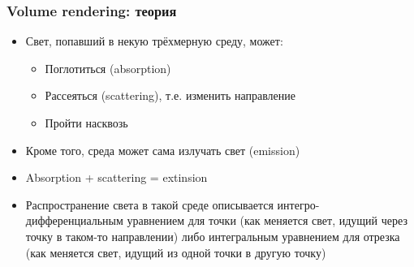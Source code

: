 \documentclass{beamer}
\begin{document}
\begin{frame}[fragile]
\frametitle{Volume rendering: теория}
\begin{itemize}
\item Свет, попавший в некую трёхмерную среду, может:
\pause
\begin{itemize}
\item Поглотиться (absorption)
\pause
\item Рассеяться (scattering), т.е. изменить направление
\pause
\item Пройти насквозь
\end{itemize}
\pause
\item Кроме того, среда может сама излучать свет (emission)
\pause
\item Absorption + scattering = extinsion
\pause
\item Распространение света в такой среде описывается интегро-дифференциальным уравнением для точки (как меняется свет, идущий через точку в таком-то направлении) либо интегральным уравнением для отрезка (как меняется свет, идущий из одной точки в другую точку)
\end{itemize}
\end{frame}
\end{document}
